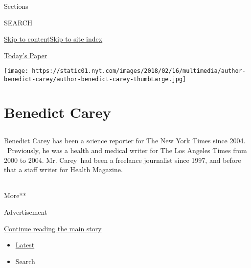 Sections

SEARCH

\protect\hyperlink{site-content}{Skip to
content}\protect\hyperlink{site-index}{Skip to site index}

\href{https://myaccount.nytimes.com/auth/login?response_type=cookie\&client_id=vi}{}

\href{https://www.nytimes.com/section/todayspaper}{Today's Paper}

\texttt{[image: https://static01.nyt.com/images/2018/02/16/multimedia/author-benedict-carey/author-benedict-carey-thumbLarge.jpg]}

\hypertarget{benedict-carey}{%
\section{Benedict Carey}\label{benedict-carey}}

\subsection{}

Benedict Carey has been a science reporter for The New York Times since
2004. ~Previously, he was a health and medical writer for The Los
Angeles Times from 2000 to 2004. Mr. Carey~had been a freelance
journalist since 1997, and before that a staff writer for Health
Magazine.~ ~ ~ ~ ~ ~ ~ ~ ~ ~ ~ ~ ~ ~ ~ ~ ~ ~ ~ ~ ~ ~ ~ ~ ~ ~ ~ ~ ~

More**

Advertisement

\protect\hyperlink{after-mid1}{Continue reading the main story}

\begin{itemize}
\tightlist
\item
  \protect\hyperlink{stream-panel}{Latest}
\item
  Search
\end{itemize}

